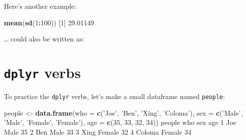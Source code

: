 \documentclass[]{book}
\newenvironment{Shaded}{\begin{snugshade}}{\end{snugshade}}
\newcommand{\DataTypeTok}[1]{\textcolor[rgb]{0.13,0.29,0.53}{#1}}
\newcommand{\DecValTok}[1]{\textcolor[rgb]{0.00,0.00,0.81}{#1}}
\newcommand{\FloatTok}[1]{\textcolor[rgb]{0.00,0.00,0.81}{#1}}
\newcommand{\KeywordTok}[1]{\textcolor[rgb]{0.13,0.29,0.53}{\textbf{#1}}}
\newcommand{\NormalTok}[1]{#1}
\newcommand{\OperatorTok}[1]{\textcolor[rgb]{0.81,0.36,0.00}{\textbf{#1}}}
\newcommand{\StringTok}[1]{\textcolor[rgb]{0.31,0.60,0.02}{#1}}
\begin{document}
Here's another example:

\begin{Shaded}
\begin{Highlighting}[]
\KeywordTok{mean}\NormalTok{(}\KeywordTok{sd}\NormalTok{(}\DecValTok{1}\OperatorTok{:}\DecValTok{100}\NormalTok{))}
\NormalTok{[}\DecValTok{1}\NormalTok{] }\FloatTok{29.01149}
\end{Highlighting}
\end{Shaded}

\ldots{} could also be written as:

\begin{Shaded}
\end{Shaded}

\hypertarget{dplyr-verbs}{%
\section*{\texorpdfstring{\texttt{dplyr} verbs}{dplyr verbs}}\label{dplyr-verbs}}

To practice the \texttt{dplyr} verbs, let's make a small dataframe named \texttt{people}:

\begin{Shaded}
\begin{Highlighting}[]
\NormalTok{people <-}\StringTok{ }\KeywordTok{data.frame}\NormalTok{(}\DataTypeTok{who =} \KeywordTok{c}\NormalTok{(}\StringTok{'Joe'}\NormalTok{, }\StringTok{'Ben'}\NormalTok{, }\StringTok{'Xing'}\NormalTok{, }\StringTok{'Coloma'}\NormalTok{),}
                    \DataTypeTok{sex =} \KeywordTok{c}\NormalTok{(}\StringTok{'Male'}\NormalTok{, }\StringTok{'Male'}\NormalTok{, }\StringTok{'Female'}\NormalTok{, }\StringTok{'Female'}\NormalTok{),}
                    \DataTypeTok{age =} \KeywordTok{c}\NormalTok{(}\DecValTok{35}\NormalTok{, }\DecValTok{33}\NormalTok{, }\DecValTok{32}\NormalTok{, }\DecValTok{34}\NormalTok{))}
\NormalTok{people}
\NormalTok{     who    sex age}
\DecValTok{1}\NormalTok{    Joe   Male  }\DecValTok{35}
\DecValTok{2}\NormalTok{    Ben   Male  }\DecValTok{33}
\DecValTok{3}\NormalTok{   Xing Female  }\DecValTok{32}
\DecValTok{4}\NormalTok{ Coloma Female  }\DecValTok{34}
\end{Highlighting}
\end{Shaded}
\end{document}
